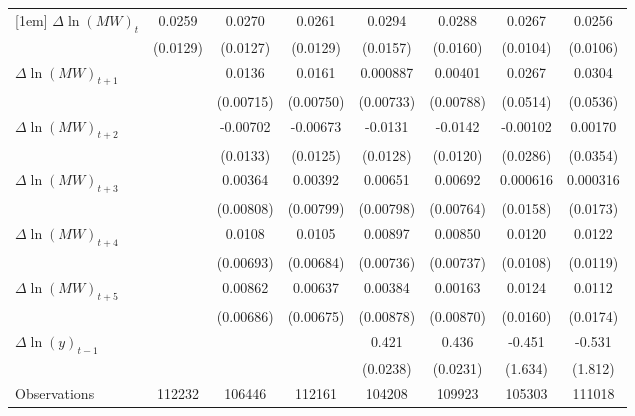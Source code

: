 {\begin{tabular}{l*{7}{c}}
[1em]
$\Delta \ln(MW)_{t}$&   0.0259\sym{*}  &   0.0270\sym{**} &   0.0261\sym{*}  &   0.0294\sym{*}  &   0.0288\sym{*}  &   0.0267\sym{**} &   0.0256\sym{**} \\
          & (0.0129)         & (0.0127)         & (0.0129)         & (0.0157)         & (0.0160)         & (0.0104)         & (0.0106)         \\
[1em]
$\Delta \ln(MW)_{t+1}$&                  &   0.0136\sym{*}  &   0.0161\sym{**} & 0.000887         &  0.00401         &   0.0267         &   0.0304         \\
          &                  &(0.00715)         &(0.00750)         &(0.00733)         &(0.00788)         & (0.0514)         & (0.0536)         \\
[1em]
$\Delta \ln(MW)_{t+2}$&                  & -0.00702         & -0.00673         &  -0.0131         &  -0.0142         & -0.00102         &  0.00170         \\
          &                  & (0.0133)         & (0.0125)         & (0.0128)         & (0.0120)         & (0.0286)         & (0.0354)         \\
[1em]
$\Delta \ln(MW)_{t+3}$&                  &  0.00364         &  0.00392         &  0.00651         &  0.00692         & 0.000616         & 0.000316         \\
          &                  &(0.00808)         &(0.00799)         &(0.00798)         &(0.00764)         & (0.0158)         & (0.0173)         \\
[1em]
$\Delta \ln(MW)_{t+4}$&                  &   0.0108         &   0.0105         &  0.00897         &  0.00850         &   0.0120         &   0.0122         \\
          &                  &(0.00693)         &(0.00684)         &(0.00736)         &(0.00737)         & (0.0108)         & (0.0119)         \\
[1em]
$\Delta \ln(MW)_{t+5}$&                  &  0.00862         &  0.00637         &  0.00384         &  0.00163         &   0.0124         &   0.0112         \\
          &                  &(0.00686)         &(0.00675)         &(0.00878)         &(0.00870)         & (0.0160)         & (0.0174)         \\
[1em]
$\Delta \ln(y)_{t-1}$&                  &                  &                  &    0.421\sym{***}&    0.436\sym{***}&   -0.451         &   -0.531         \\
          &                  &                  &                  & (0.0238)         & (0.0231)         &  (1.634)         &  (1.812)         \\
\hline
Observations&   112232         &   106446         &   112161         &   104208         &   109923         &   105303         &   111018         \\
\hline\hline
\end{tabular}
}

